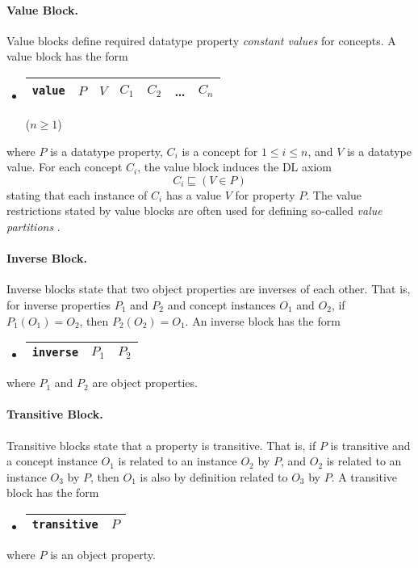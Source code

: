 \documentclass[11pt,onecolumn]{article}
\begin{document}
\paragraph{Value Block.} Value blocks define required datatype
property \emph{constant values} for concepts. A value block has the
form
\begin{itemize}
\item[]
  \begin{tabular}{|l|l|l|l|l|l|l|}\hline \texttt{value} & $P$ & $V$ & $C_1$
    & $C_2$ & \dots & $C_n$ \\ \hline
  \end{tabular} \hfill ($n \ge 1$)
\end{itemize}
where $P$ is a datatype property, $C_i$ is a concept for $1 \le i \le
n$, and $V$ is a datatype value. For each concept $C_i$, the value
block induces the DL axiom \[C_i \sqsubseteq (V \in P)\] stating that
each instance of $C_i$ has a value $V$ for property $P$.  The value
restrictions stated by value blocks are often used for defining
so-called \emph{value partitions} \cite{co-ode}.

\paragraph{Inverse Block.} Inverse blocks state that two object
properties are inverses of each other. That is, for inverse properties
$P_1$ and $P_2$ and concept instances $O_1$ and $O_2$, if $P_1(O_1) =
O_2$, then $P_2(O_2) = O_1$.  An inverse block has the form
\begin{itemize}
\item[]
  \begin{tabular}{|l|l|l|}\hline \texttt{inverse} & $P_1$ & $P_2$
\\ \hline
  \end{tabular}
\end{itemize}
where $P_1$ and $P_2$ are object properties. 

\paragraph{Transitive Block.} Transitive blocks state that a property
is transitive. That is, if $P$ is transitive and a concept instance
$O_1$ is related to an instance $O_2$ by $P$, and $O_2$ is related to
an instance $O_3$ by $P$, then $O_1$ is also by definition related to
$O_3$ by $P$. A transitive block has the form
\begin{itemize}
\item[]
  \begin{tabular}{|l|l|}\hline \texttt{transitive} & $P$ 
\\ \hline
  \end{tabular}
\end{itemize}
where $P$ is an object property. 
\end{document}
